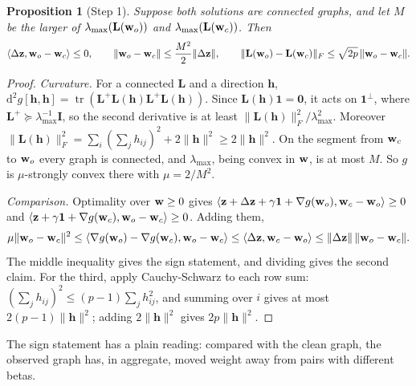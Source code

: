 \documentclass[11pt,a4paper]{article}
\newcommand{\Lap}{\mathbf{L}}
\newcommand{\Imat}{\mathbf{I}}
\newcommand{\one}{\mathbf{1}}
\newcommand{\tr}{\operatorname{tr}}
\newtheorem{proposition}{Proposition}
\theoremstyle{remark}
\begin{document}
\begin{proposition}[Step 1]\label{prop:step1}
Suppose both solutions are connected graphs, and let $M$ be the larger of
$\lambda_{\max}(\Lap(\wvec_o))$ and $\lambda_{\max}(\Lap(\wvec_c))$. Then
\[
  \langle\Delta\zvec,\wvec_o-\wvec_c\rangle\le0,\qquad
  \lVert\wvec_o-\wvec_c\rVert\le\frac{M^2}{2}\lVert\Delta\zvec\rVert,\qquad
  \lVert\Lap(\wvec_o)-\Lap(\wvec_c)\rVert_F\le\sqrt{2p}\,\lVert\wvec_o-\wvec_c\rVert .
\]
\end{proposition}
\begin{proof}
\emph{Curvature.} For a connected $\Lap$ and a direction $\mathbf h$,
$\mathrm d^2g[\mathbf h,\mathbf h]=\tr(\Lap^+\Lap(\mathbf h)\Lap^+\Lap(\mathbf h))$. Since
$\Lap(\mathbf h)\one=\mathbf 0$, it acts on $\one^\perp$, where $\Lap^+\succeq
\lambda_{\max}^{-1}\Imat$, so the second derivative is at least
$\lVert\Lap(\mathbf h)\rVert_F^2/\lambda_{\max}^2$. Moreover
$\lVert\Lap(\mathbf h)\rVert_F^2=\sum_i(\sum_jh_{ij})^2+2\lVert\mathbf h\rVert^2\ge
2\lVert\mathbf h\rVert^2$. On the segment from $\mathbf w_c$ to $\mathbf w_o$ every graph is
connected, and $\lambda_{\max}$, being convex in $\mathbf w$, is at most $M$. So $g$ is
$\mu$-strongly convex there with $\mu=2/M^2$.

\emph{Comparison.} Optimality over $\mathbf w\ge0$ gives
$\langle\zvec+\Delta\zvec+\gamma\one+\nabla g(\wvec_o),\wvec_c-\wvec_o\rangle\ge0$ and
$\langle\zvec+\gamma\one+\nabla g(\wvec_c),\wvec_o-\wvec_c\rangle\ge0$. Adding them,
\[
  \mu\lVert\mathbf w_o-\mathbf w_c\rVert^2\le
  \langle\nabla g(\mathbf w_o)-\nabla g(\mathbf w_c),\mathbf w_o-\mathbf w_c\rangle\le
  \langle\Delta\mathbf z,\mathbf w_c-\mathbf w_o\rangle\le\lVert\Delta\mathbf z\rVert\,\lVert\mathbf w_o-\mathbf w_c\rVert .
\]
The middle inequality gives the sign statement, and dividing gives the second claim.
For the third, apply Cauchy-Schwarz to each row sum: $(\sum_jh_{ij})^2\le
(p-1)\sum_jh_{ij}^2$, and summing over $i$ gives at most $2(p-1)\lVert\mathbf h\rVert^2$;
adding $2\lVert\mathbf h\rVert^2$ gives $2p\lVert\mathbf h\rVert^2$.
\end{proof}

The sign statement has a plain reading: compared with the clean graph, the observed
graph has, in aggregate, moved weight away from pairs with different betas.
\end{document}
